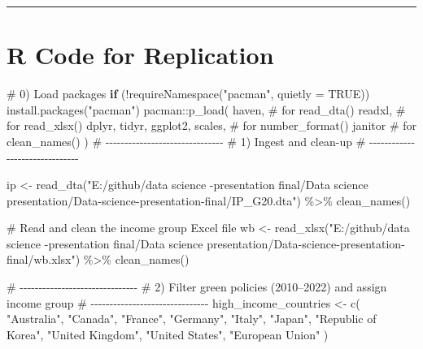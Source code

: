 \documentclass[
  letterpaper,
  DIV=11,
  numbers=noendperiod]{scrartcl}
\newenvironment{Shaded}{\begin{snugshade}}{\end{snugshade}}
\newcommand{\AttributeTok}[1]{\textcolor[rgb]{0.40,0.45,0.13}{#1}}
\newcommand{\CommentTok}[1]{\textcolor[rgb]{0.37,0.37,0.37}{#1}}
\newcommand{\ConstantTok}[1]{\textcolor[rgb]{0.56,0.35,0.01}{#1}}
\newcommand{\ControlFlowTok}[1]{\textcolor[rgb]{0.00,0.23,0.31}{\textbf{#1}}}
\newcommand{\FunctionTok}[1]{\textcolor[rgb]{0.28,0.35,0.67}{#1}}
\newcommand{\NormalTok}[1]{\textcolor[rgb]{0.00,0.23,0.31}{#1}}
\newcommand{\OtherTok}[1]{\textcolor[rgb]{0.00,0.23,0.31}{#1}}
\newcommand{\SpecialCharTok}[1]{\textcolor[rgb]{0.37,0.37,0.37}{#1}}
\newcommand{\StringTok}[1]{\textcolor[rgb]{0.13,0.47,0.30}{#1}}
\begin{document}
\begin{center}\rule{0.5\linewidth}{0.5pt}\end{center}

\section{R Code for Replication}\label{r-code-for-replication-1}

\begin{Shaded}
\begin{Highlighting}[]
\CommentTok{\#  0) Load packages}
\ControlFlowTok{if}\NormalTok{ (}\SpecialCharTok{!}\FunctionTok{requireNamespace}\NormalTok{(}\StringTok{"pacman"}\NormalTok{, }\AttributeTok{quietly =} \ConstantTok{TRUE}\NormalTok{)) }\FunctionTok{install.packages}\NormalTok{(}\StringTok{"pacman"}\NormalTok{)}
\NormalTok{pacman}\SpecialCharTok{::}\FunctionTok{p\_load}\NormalTok{(}
\NormalTok{  haven,      }\CommentTok{\# for read\_dta()}
\NormalTok{  readxl,     }\CommentTok{\# for read\_xlsx()}
\NormalTok{  dplyr,      }
\NormalTok{  tidyr,}
\NormalTok{  ggplot2,}
\NormalTok{  scales,     }\CommentTok{\# for number\_format()}
\NormalTok{  janitor     }\CommentTok{\# for clean\_names()}
\NormalTok{)}
\CommentTok{\# {-}{-}{-}{-}{-}{-}{-}{-}{-}{-}{-}{-}{-}{-}{-}{-}{-}{-}{-}{-}{-}{-}{-}{-}{-}{-}{-}{-}{-}{-}{-}}
\CommentTok{\#  1) Ingest and clean{-}up }
\CommentTok{\# {-}{-}{-}{-}{-}{-}{-}{-}{-}{-}{-}{-}{-}{-}{-}{-}{-}{-}{-}{-}{-}{-}{-}{-}{-}{-}{-}{-}{-}{-}{-}}

\NormalTok{ip }\OtherTok{\textless{}{-}} \FunctionTok{read\_dta}\NormalTok{(}\StringTok{"E:/github/data science {-}presentation final/Data science presentation/Data{-}science{-}presentation{-}final/IP\_G20.dta"}\NormalTok{) }\SpecialCharTok{\%\textgreater{}\%}
  \FunctionTok{clean\_names}\NormalTok{()}

\CommentTok{\# Read and clean the income group Excel file}
\NormalTok{wb }\OtherTok{\textless{}{-}} \FunctionTok{read\_xlsx}\NormalTok{(}\StringTok{"E:/github/data science {-}presentation final/Data science presentation/Data{-}science{-}presentation{-}final/wb.xlsx"}\NormalTok{) }\SpecialCharTok{\%\textgreater{}\%}
  \FunctionTok{clean\_names}\NormalTok{()}

\CommentTok{\# {-}{-}{-}{-}{-}{-}{-}{-}{-}{-}{-}{-}{-}{-}{-}{-}{-}{-}{-}{-}{-}{-}{-}{-}{-}{-}{-}{-}{-}{-}{-}}
\CommentTok{\#  2) Filter green policies (2010–2022) and assign income group }
\CommentTok{\# {-}{-}{-}{-}{-}{-}{-}{-}{-}{-}{-}{-}{-}{-}{-}{-}{-}{-}{-}{-}{-}{-}{-}{-}{-}{-}{-}{-}{-}{-}{-}}
\NormalTok{high\_income\_countries }\OtherTok{\textless{}{-}} \FunctionTok{c}\NormalTok{(}
  \StringTok{"Australia"}\NormalTok{, }\StringTok{"Canada"}\NormalTok{, }\StringTok{"France"}\NormalTok{, }\StringTok{"Germany"}\NormalTok{, }\StringTok{"Italy"}\NormalTok{,}
  \StringTok{"Japan"}\NormalTok{, }\StringTok{"Republic of Korea"}\NormalTok{, }\StringTok{"United Kingdom"}\NormalTok{, }\StringTok{"United States"}\NormalTok{, }\StringTok{"European Union"}
\NormalTok{)}


\end{Highlighting}
\end{Shaded}
\end{document}
